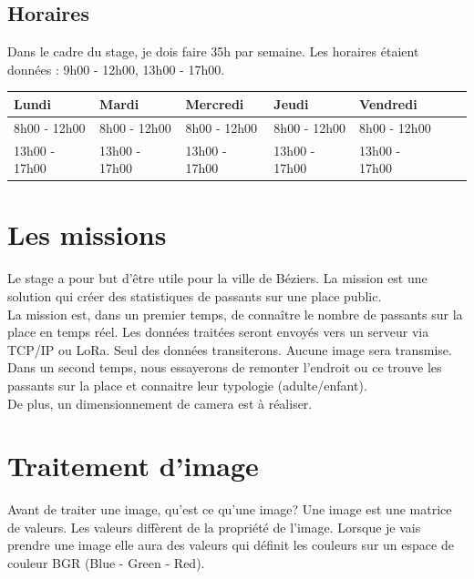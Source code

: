 \documentclass[12pt, french]{report}
\begin{document}
\subsection*{Horaires}
Dans le cadre du stage, je dois faire 35h par semaine. Les horaires étaient données :
9h00 - 12h00, 13h00 - 17h00.

\begin{center}
        \begin{tabular}{|l|l|l|l|l|c|r|}
                \hline
                Lundi & Mardi & Mercredi & Jeudi & Vendredi \\
                \hline
                8h00 - 12h00 & 8h00 - 12h00 & 8h00 - 12h00 & 8h00 - 12h00 & 8h00 - 12h00 \\
                13h00 - 17h00 & 13h00 - 17h00 & 13h00 - 17h00 & 13h00 - 17h00 & 13h00 - 17h00 \\ 
                \hline
        \end{tabular}
\end{center}
\newpage

\section{Les missions}


Le stage a pour but d'être utile pour la ville de Béziers. La mission est une solution qui créer des statistiques de passants sur une place public. \\

La mission est, dans un premier temps, de connaître le nombre de passants sur la place en temps réel. Les données traitées seront envoyés vers un serveur via TCP/IP ou LoRa. Seul des données transiterons. Aucune image sera transmise.\\ 

Dans un second temps, nous essayerons de remonter l'endroit ou ce trouve les passants sur la place et connaitre leur typologie (adulte/enfant).\\

De plus, un dimensionnement de camera est à réaliser.
\newpage
\strut									      %
\newpage							              %
\newpage

\section{Traitement d'image}
Avant de traiter une image, qu'est ce qu'une image? Une image est une matrice de valeurs. Les valeurs diffèrent de la propriété de l'image. Lorsque je vais prendre une image elle aura des valeurs qui définit les couleurs sur un espace de couleur BGR (Blue - Green - Red).
\end{document}
